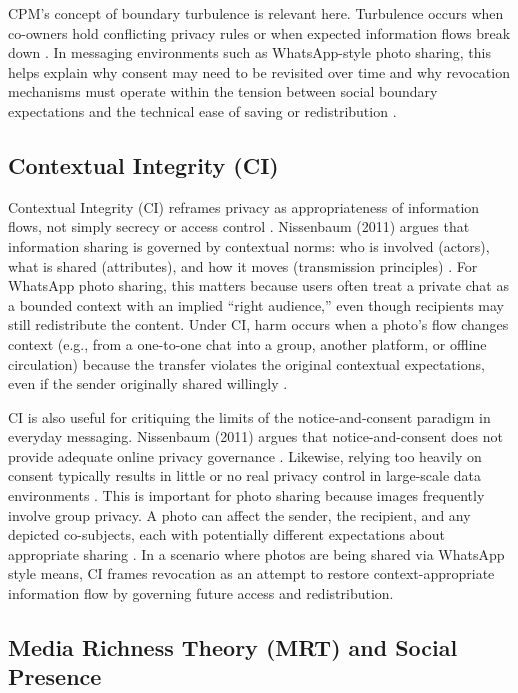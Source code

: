 CPM’s concept of boundary turbulence is relevant here. Turbulence occurs when co-owners hold conflicting privacy rules or when expected information flows break down \cite{petronio_cpm_2020}. In messaging environments such as WhatsApp-style photo sharing, this helps explain why consent may need to be revisited over time and why revocation mechanisms must operate within the tension between social boundary expectations and the technical ease of saving or redistribution \cite{child_petronio_cmc_privacy_2011, petronio_cpm_2020}.

\subsection{Contextual Integrity (CI)}
Contextual Integrity (CI) reframes privacy as appropriateness of information flows, not simply secrecy or access control \cite{nissenbaum_contextual_2011}. Nissenbaum (2011) argues that information sharing is governed by contextual norms: who is involved (actors), what is shared (attributes), and how it moves (transmission principles) \cite{nissenbaum_contextual_2011}. For WhatsApp photo sharing, this matters because users often treat a private chat as a bounded context with an implied “right audience,” even though recipients may still redistribute the content. Under CI, harm occurs when a photo’s flow changes context (e.g., from a one-to-one chat into a group, another platform, or offline circulation) because the transfer violates the original contextual expectations, even if the sender originally shared willingly \cite{nissenbaum_contextual_2011}.
 
CI is also useful for critiquing the limits of the notice-and-consent paradigm in everyday messaging. Nissenbaum (2011) argues that notice-and-consent does not provide adequate online privacy governance \cite{nissenbaum_contextual_2011}. Likewise, relying too heavily on consent typically results in little or no real privacy control in large-scale data environments \cite{bourgeus_vandercruysse_2024}. This is important for photo sharing because images frequently involve group privacy. A photo can affect the sender, the recipient, and any depicted co-subjects, each with potentially different expectations about appropriate sharing \cite{bourgeus_vandercruysse_2024}. In a scenario where photos are being shared via WhatsApp style means, CI frames revocation as an attempt to restore context-appropriate information flow by governing future access and redistribution.

\subsection{Media Richness Theory (MRT) and Social Presence}

